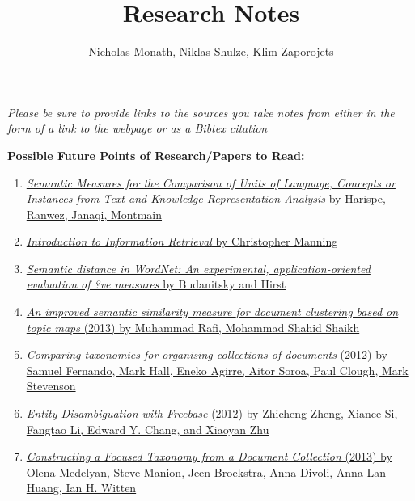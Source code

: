 \documentclass[12pt]{article}
\newcommand{\bt}[1]{\textbf{#1}}
\begin{document}
\title{Research Notes}
\author{Nicholas Monath, Niklas Shulze, Klim Zaporojets}
\maketitle  

\begin{framed}
\emph{Please be sure to provide links to the sources you take notes from either in the form of a link to the webpage or as a Bibtex citation}
\end{framed}

\begin{framed}
\centering
\bt{Possible Future Points of Research/Papers to Read:}
\begin{enumerate}

\item \href{http://arxiv.org/pdf/1310.1285v2.pdf}{\emph{Semantic Measures for the Comparison of Units of Language, Concepts or Instances from Text and Knowledge Representation Analysis} by Harispe, Ranwez, Janaqi, Montmain}
\item \href{http://www-nlp.stanford.edu/IR-book/}{\emph{Introduction to Information Retrieval} by Christopher Manning}
\item \href{ftp://learning.cs.utoronto.ca/pub/gh/Budanitsky+Hirst-2001.pdf}{\emph{Semantic distance in WordNet:
An experimental, application-oriented evaluation of ?ve measures} by Budanitsky and Hirst}

\item \href{https://github.com/nmonath/NLPProject/blob/master/research/papers/1303.4087.pdf}{\emph{An improved semantic similarity measure for
document clustering based on topic maps} (2013) by Muhammad Rafi, Mohammad Shahid Shaikh}
\item \href{https://github.com/nmonath/NLPProject/blob/master/research/papers/6_taxonomy_comparation.pdf}{\emph{Comparing taxonomies for organising collections of
documents} (2012) by Samuel Fernando, Mark Hall, Eneko Agirre, Aitor Soroa, Paul Clough, Mark Stevenson}

\item \href{https://github.com/nmonath/NLPProject/blob/master/research/papers/7-entity_desambiguation_freebase.pdf}{\emph{Entity Disambiguation with Freebase} (2012) by Zhicheng Zheng, Xiance Si, Fangtao Li, Edward Y. Chang, and Xiaoyan Zhu}

\item \href{https://github.com/nmonath/NLPProject/blob/master/research/papers/8_OM-et\%20al-focusedtaxonomies.pdf}{\emph{Constructing a Focused Taxonomy from a
Document Collection} (2013) by Olena Medelyan, Steve Manion, Jeen Broekstra, Anna Divoli,
Anna-Lan Huang, Ian H. Witten}


\end{enumerate}
\end{framed}
\end{document}
